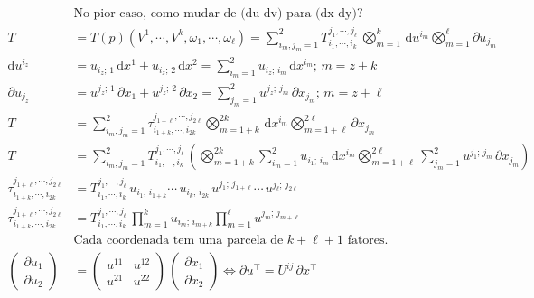 \documentclass[12pt]{article}
\begin{document}
\begin{align}
  &\text{No pior caso, como mudar de (du dv) para (dx dy)?} \\
  T &= T(p)(V^1, \cdots, V^k, \omega_1, \cdots, \omega_\ell) = \sum_{i_m, j_m = 1}^2 T_{i_1, \cdots, i_k}^{j_1, \cdots, j_\ell}\, \bigotimes_{m = 1}^k \,\mathrm{d}u^{i_m} \bigotimes_{m = 1}^\ell \partial u_{j_m} \\
  \mathrm{d}u^{i_z} &= u_{i_z;\,1} \,\mathrm{d}x^1 + u_{i_z;\,2} \,\mathrm{d}x^2 = \sum_{i_m = 1}^2 u_{i_z;\,i_m} \,\mathrm{d}x^{i_m};\,m = z + k \\
  \partial u_{j_z} &= u^{j_z;\,1} \,\partial x_1 + u^{j_z;\,2} \,\partial x_2 = \sum_{j_m = 1}^2 u^{j_z;\,j_m} \,\partial x_{j_m};\,m = z + \ell \\
  T &= \sum_{i_m, j_m = 1}^2 \tau_{i_{1+k}, \cdots, i_{2k}}^{j_{1+\ell}, \cdots, j_{2\ell}} \bigotimes_{m = 1 + k}^{2k} \,\mathrm{d}x^{i_m} \bigotimes_{m = 1+\ell}^{2\ell} \partial x_{j_m} \\
  T &= \sum_{i_m, j_m = 1}^2 T_{i_1, \cdots, i_k}^{j_1, \cdots, j_\ell}\, \left( \bigotimes_{m = 1 + k}^{2k} \sum_{i_m = 1}^2 u_{i_1;\,i_m} \,\mathrm{d}x^{i_m} \bigotimes_{m = 1 + \ell}^{2\ell} \sum_{j_m = 1}^2 u^{j_1;\,j_m} \,\partial x_{j_m} \right)  \\
  \tau_{i_{1+k}, \cdots, i_{2k}}^{j_{1+\ell}, \cdots, j_{2\ell}} &= T_{i_1, \cdots, i_k}^{j_1, \cdots, j_\ell}\, u_{i_1;\,i_{1+k}} \cdots \, u_{i_k;\,i_{2k}} \, u^{j_1;\,j_{1+\ell}} \cdots \, u^{j_\ell;\,j_{2\ell}} \\
  \tau_{i_{1+k}, \cdots, i_{2k}}^{j_{1+\ell}, \cdots, j_{2\ell}} &= T_{i_1, \cdots, i_k}^{j_1, \cdots, j_\ell}\,\prod_{m=1}^k u_{i_m;\,i_{m+k}}  \prod_{m=1}^\ell u^{j_m;\,j_{m+\ell}} \\
  &\text{Cada coordenada tem uma parcela de } k + \ell + 1 \text{ fatores.} \\
  \left( \begin{matrix} \partial u_1 \\ \partial u_2 \end{matrix} \right) &= \left( \begin{matrix} u^{11} & u^{12} \\ u^{21} & u^{22} \end{matrix} \right) \, \left( \begin{matrix} \partial x_1 \\ \partial x_2 \end{matrix} \right) \Leftrightarrow \partial u^\top = U^{ij} \, \partial x^\top \\

\end{align}
\end{document}

